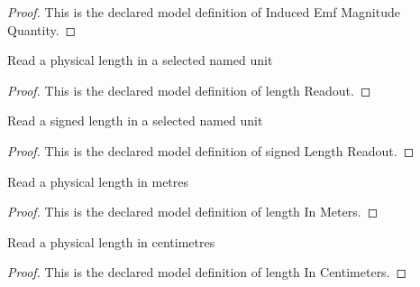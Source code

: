 \begin{proof}
  This is the declared model definition of Induced Emf Magnitude Quantity.
\end{proof}
\begin{definition}
  \label{def:physics:phyx-mini-0927:phyxminiproblems-problemphyxmini0927-lengthreadout}
  Read a physical length in a selected named unit
\end{definition}
\begin{proof}
  This is the declared model definition of length Readout.
\end{proof}
\begin{definition}
  \label{def:physics:phyx-mini-0927:phyxminiproblems-problemphyxmini0927-signedlengthreadout}
  Read a signed length in a selected named unit
\end{definition}
\begin{proof}
  This is the declared model definition of signed Length Readout.
\end{proof}
\begin{definition}
  \label{def:physics:phyx-mini-0927:phyxminiproblems-problemphyxmini0927-lengthinmeters}
  Read a physical length in metres
\end{definition}
\begin{proof}
  This is the declared model definition of length In Meters.
\end{proof}
\begin{definition}
  \label{def:physics:phyx-mini-0927:phyxminiproblems-problemphyxmini0927-lengthincentimeters}
  Read a physical length in centimetres
\end{definition}
\begin{proof}
  This is the declared model definition of length In Centimeters.
\end{proof}
